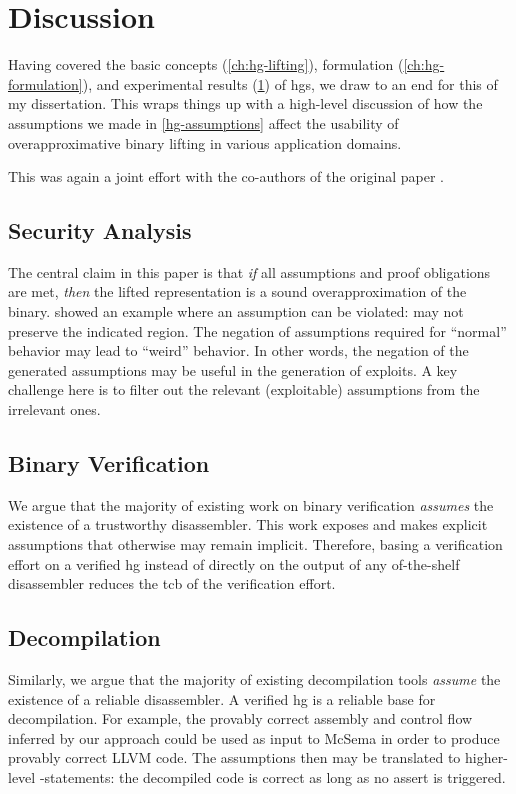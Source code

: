\chapter{Discussion}\label{ch:hg-discussion}
Having covered the basic concepts (\cref{ch:hg-lifting}), formulation (\cref{ch:hg-formulation}), and experimental results (\cref{ch:hg-discussion}) of \acp{hg}, we draw to an end for this   of my dissertation.
This  wraps things up with a high-level discussion of how the assumptions we made in \cref{hg-assumptions} affect the usability of overapproximative binary lifting in various application domains.

This  was again a joint effort with the co-authors of the original paper \autocite{verbeek2022lifting}.


\section{Security Analysis}
The central claim in this paper is that \emph{if} all assumptions and proof obligations are met,
\emph{then} the lifted representation is a sound overapproximation of the binary.
 showed an example where an assumption can be violated:  may not preserve the indicated region.
The negation of assumptions required for ``normal'' behavior may lead to ``weird'' behavior.
In other words, the negation of the generated assumptions may be useful in the generation of exploits.
A key challenge here is to filter out the relevant (exploitable) assumptions from the irrelevant ones.

\section{Binary Verification}
We argue that the majority of existing work on binary verification \emph{assumes} the existence of a trustworthy disassembler.
This work exposes and makes explicit assumptions that otherwise may remain implicit.
Therefore, basing a verification effort on a verified \ac{hg} instead of directly on the output of any of-the-shelf disassembler reduces the \ac{tcb} of the verification effort.

\section{Decompilation}
Similarly, we argue that the majority of existing decompilation tools \emph{assume} the existence of a reliable disassembler.
A verified \ac{hg} is a reliable base for decompilation.
For example, the provably correct assembly and control flow inferred by our approach could be used as input to McSema \autocite{dinaburg2014mcsema} in order to produce provably correct LLVM code.
The assumptions then may be translated to higher-level -statements: the decompiled code is correct as long as no assert is triggered.

